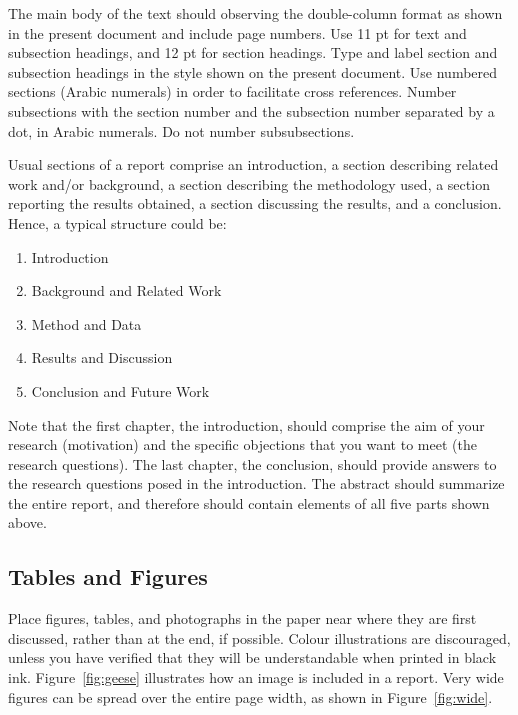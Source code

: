 \documentclass[11pt]{article}
\begin{document}
The main body of the text should observing the double-column format as
shown in the present document and include page numbers.  Use 11 pt for
text and subsection headings, and 12 pt for section headings.  Type
and label section and subsection headings in the style shown on the
present document.  Use numbered sections (Arabic numerals) in order to
facilitate cross references. Number subsections with the section
number and the subsection number separated by a dot, in Arabic
numerals. Do not number subsubsections.

Usual sections of a report comprise an introduction, a section
describing related work and/or background, a section describing the
methodology used, a section reporting the results obtained, a section
discussing the results, and a conclusion. Hence, a typical structure
could be:

\begin{enumerate}
\item Introduction
\item Background and Related Work
\item Method and Data
\item Results and Discussion
\item Conclusion and Future Work
\end{enumerate}

Note that the first chapter, the introduction, should comprise the aim
of your research (motivation) and the specific objections that you
want to meet (the research questions).  The last chapter, the
conclusion, should provide answers to the research questions posed in
the introduction. The abstract should summarize the entire report, and
therefore should contain elements of all five parts shown above.


\subsection{Tables and Figures}

Place figures, tables, and photographs in the paper near where they
are first discussed, rather than at the end, if possible.  Colour
illustrations are discouraged, unless you have verified that they will
be understandable when printed in black ink. Figure~\ref{fig:geese}
illustrates how an image is included in a report.  Very wide figures
can be spread over the entire page width, as shown in
Figure~\ref{fig:wide}.
\end{document}
